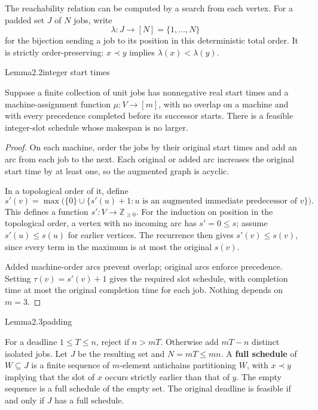 The reachability relation can be computed by a search from each vertex. For a padded set \(J\) of \(N\) jobs, write \[
\lambda:J\longrightarrow[N]=\{1,\ldots,N\}
\] for the bijection sending a job to its position in this deterministic total order. It is strictly order-preserving: \(x\prec y\) implies \(\lambda(x)<\lambda(y)\).

\begin{numbered}{Lemma}{2.2}{integer start times}

Suppose a finite collection of unit jobs has nonnegative real start times and a machine-assignment function \(\mu:V\to[m]\), with no overlap on a machine and with every precedence completed before its successor starts. There is a feasible integer-slot schedule whose makespan is no larger.

\end{numbered}

\begin{proof}
On each machine, order the jobs by their original start times and add an arc from each job to the next. Each original or added arc increases the original start time by at least one, so the augmented graph is acyclic.

In a topological order of it, define \[
s'(v)=\max\bigl(\{0\}\cup\{s'(u)+1:u\text{ is an augmented immediate predecessor of }v\}\bigr).
\] This defines a function \(s':V\to\mathbb Z_{\geq0}\). For the induction on position in the topological order, a vertex with no incoming arc has \(s'=0\leq s\); assume \(s'(u)\leq s(u)\) for earlier vertices. The recurrence then gives \(s'(v)\leq s(v)\), since every term in the maximum is at most the original \(s(v)\).

Added machine-order arcs prevent overlap; original arcs enforce precedence. Setting \(\tau(v)=s'(v)+1\) gives the required slot schedule, with completion time at most the original completion time for each job. Nothing depends on \(m=3\).
\end{proof}

\begin{numbered}{Lemma}{2.3}{padding}

For a deadline \(1\leq T\leq n\), reject if \(n>mT\). Otherwise add \(mT-n\) distinct isolated jobs. Let \(J\) be the resulting set and \(N=mT\leq mn\). A \textbf{full schedule} of \(W\subseteq J\) is a finite sequence of \(m\)-element antichains partitioning \(W\), with \(x\prec y\) implying that the slot of \(x\) occurs strictly earlier than that of \(y\). The empty sequence is a full schedule of the empty set. The original deadline is feasible if and only if \(J\) has a full schedule.

\end{numbered}

